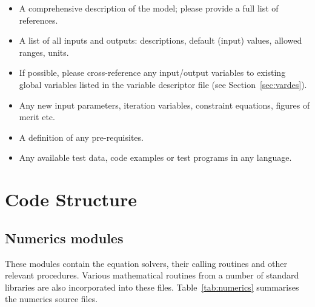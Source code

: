 \begin{itemize}

\item A comprehensive description of the model; please provide a full list of
  references.

\item A list of all inputs and outputs: descriptions, default (input) values,
  allowed ranges, units.

\item If possible, please cross-reference any input/output variables to
  existing global variables listed in the variable descriptor file (see
  Section~\ref{sec:vardes}).

\item Any new input parameters, iteration variables, constraint equations, figures of merit etc.

\item A definition of any pre-requisites.

\item Any available test data, code examples or test programs in any language.

\end{itemize}

\section{Code Structure}

\subsection{Numerics modules}
\label{sec:numerics_modules}

These modules contain the equation solvers, their calling routines and other
relevant procedures. Various mathematical routines from a number of standard
libraries are also incorporated into these files. Table~\ref{tab:numerics}
summarises the numerics source files.

